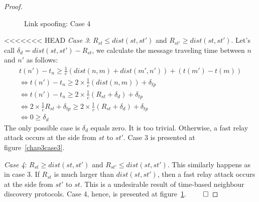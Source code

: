 \begin{flushleft}
\begin{flushleft}
\begin{Definition}
\begin{itemize}
\begin{Definition}
\begin{proof}
\begin{figure}
    \caption{Link spoofing: Case 4} \label{chap3case4} 
    \centering

\end{figure}

<<<<<<< HEAD
\emph{Case 3}: $R_{st} \le dist(st,st')$ and $R_{st'} \ge dist(st,st')$. Let's call $\delta_d = dist(st,st') - R_{st}$, we calculate the message traveling time between $n$ and $n'$ as follows: 
\begin{equation*}
\begin{split}
		t(n') - t_n \ge \frac 1 {c}(dist(n,m) + dist(m', n')) + (t(m') - t(m)) \\ \Leftrightarrow
		t(n') - t_n \ge 2 \times \frac 1 {c}(dist(n,m)) + \delta_{tp}\\ \Leftrightarrow
		t(n') - t_n \ge 2 \times \frac 1 {c} (R_{st} + \delta_d) + \delta_{tp} \\ \Leftrightarrow
		2 \times \frac 1 {c} R_{st} + \delta_{tp} \ge 2 \times \frac 1 {c} (R_{st} + \delta_d ) + \delta_{tp} \\ \Leftrightarrow
		0 \ge \delta_{d} 
\end{split}
\end{equation*}
The only possible case is $\delta_{d}$ equals zero. It is too trivial. Otherwise, a fast relay attack occurs at the side from $st$ to $st'$. Case 3 is presented at figure~\ref{chap3case3}.

\emph{Case 4}: $R_{st} \ge dist(st,st')$ and $R_{st'} \le dist(st,st')$. This similarly happens as in case 3. If $R_{st}$ is much larger than $dist(st,st')$, then a fast relay attack occurs at the side from $st'$ to $st$. This is a undesirable result of time-based neighbour discovery protocols. Case 4, hence, is presented at figure~\ref{chap3case4}. $\qed$


\end{proof}
\end{Definition}
\end{itemize}
\end{Definition}
\end{flushleft}
\end{flushleft}
